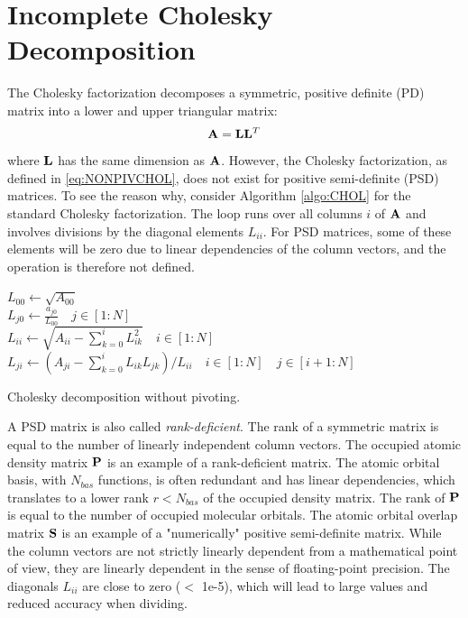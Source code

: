 
\section{Incomplete Cholesky Decomposition \label{sec:CHOLDEC}}

The Cholesky factorization decomposes a symmetric, positive definite (PD) matrix into a lower and upper triangular matrix:
\begin{equation}
\mathbf{A} = \mathbf{L} \mathbf{L}^T
\label{eq:NONPIVCHOL}
\end{equation}
\noindent where $\mathbf{L}$ has the same dimension as $\mathbf{A}$. However, the Cholesky factorization, as defined in \ref{eq:NONPIVCHOL}, does not exist for positive semi-definite (PSD) matrices. To see the reason why, consider Algorithm \ref{algo:CHOL} for the standard Cholesky factorization. The loop runs over all columns $i$ of $\mathbf{A}$  and involves divisions by the diagonal elements $L_{ii}$. For PSD matrices, some of these elements will be zero due to linear dependencies of the column vectors, and the operation is therefore not defined.

\begin{algorithm}
$L_{00} \leftarrow \sqrt{A_{00}}$
\\
$L_{j0} \leftarrow \frac{a_{j0}}{L_{00}} \quad j \in [1:N]$
\\
$L_{ii} \leftarrow \sqrt{ A_{ii} - \sum_{k=0}^{i} L_{ik}^2} \quad i \in [1:N]$ 
\\
$L_{ji} \leftarrow \left( A_{ji} - \sum_{k=0}^{i} L_{ik} L_{jk} \right) / L_{ii} \quad i \in [1:N] \quad j \in [i+1:N]$
\caption{Cholesky decomposition without pivoting.}
\label{algo:CHOL}
\end{algorithm}
 
A PSD matrix is also called \emph{rank-deficient}. The rank of a symmetric matrix is equal to the number of linearly independent column vectors. The occupied atomic density matrix $\mathbf{P}$ is an example of a rank-deficient matrix. The atomic orbital basis, with $N_{bas}$ functions, is often redundant and has linear dependencies, which translates to a lower rank $r < N_{bas}$ of the occupied density matrix. The rank of $\mathbf{P}$ is equal to the number of occupied molecular orbitals. The atomic orbital overlap matrix $\mathbf{S}$ is an example of a "numerically" positive semi-definite matrix. While the column vectors are not strictly linearly dependent from a mathematical point of view, they are linearly dependent in the sense of floating-point precision. The diagonals $L_{ii}$ are close to zero ($<$ 1e-5), which will lead to large values and reduced accuracy when dividing.  

